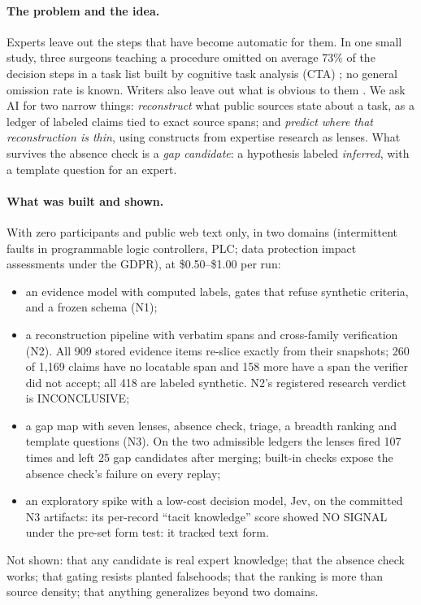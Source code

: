 \paragraph{The problem and the idea.} \evlit{} Experts leave out the steps that have become
automatic for them. In one small study, three surgeons teaching a procedure omitted on average 73\%
of the decision steps in a task list built by cognitive task analysis (CTA)
\parencite{sullivan2014use}; no general omission rate is known. Writers also leave out what is
obvious to them \parencite{gordon2013reporting}. We ask AI for two narrow things: \emph{reconstruct}
what public sources state about a task, as a ledger of labeled claims tied to exact source spans;
and \emph{predict where that reconstruction is thin}, using constructs from expertise research as
lenses. What survives the absence check is a \emph{gap candidate}: a hypothesis labeled
\emph{inferred}, with a template question for an expert.

\paragraph{What was built and shown.} \evobs{} With zero participants and public web text only, in
two domains (intermittent faults in programmable logic controllers, PLC; data protection impact
assessments under the GDPR), at \$0.50--\$1.00 per run:
\begin{itemize}[nosep]
  \item an evidence model with computed labels, gates that refuse synthetic criteria, and a frozen
    schema (N1);
  \item a reconstruction pipeline with verbatim spans and cross-family verification (N2). All 909
    stored evidence items re-slice exactly from their snapshots; 260 of 1,169 claims have no locatable span and 158 more have a span the verifier did not accept; all 418 are labeled synthetic. N2's registered research verdict is INCONCLUSIVE;
  \item a gap map with seven lenses, absence check, triage, a breadth ranking and template
    questions (N3). On the two admissible ledgers the lenses fired 107 times and left 25 gap
    candidates after merging; built-in checks expose the absence check's failure on every replay;
  \item an exploratory spike with a low-cost decision model, Jev, on the committed N3 artifacts: its per-record \enquote{tacit knowledge} score showed NO SIGNAL under the pre-set form test: it tracked text form.
\end{itemize}
Not shown: that any candidate is real expert knowledge; that the absence check works; that gating
resists planted falsehoods; that the ranking is more than source density; that anything generalizes
beyond two domains.

